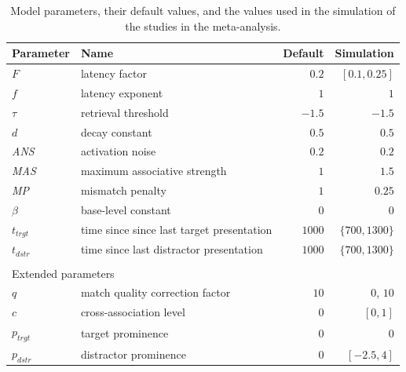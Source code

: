\documentclass{cambridge7A}\usepackage[]{graphicx}\usepackage[]{color}
\begin{document}
\begin{subappendices}
\begin{table}[!htbp]
	\caption{Model parameters, their default values, and the values used in the simulation of the studies in the meta-analysis.}
	\begin{center}
	\begin{tabular}{llrr}
	\hline
	Parameter    & Name                                      & Default & Simulation \\
	\hline
	$F$          & latency factor                            & $0.2$ & $[0.1, 0.25]$\\
	$f$          & latency exponent                          & $1$ & $1$ \\
	$\tau$       & retrieval threshold                       & $-1.5$ & $-1.5$ \\ %
	$d$          & decay constant                            & $0.5$ & $0.5$ \\
	\textit{ANS} & activation noise                          & $0.2$ & $0.2$ \\
	\textit{MAS} & maximum associative strength              & $1$ & $1.5$ \\ %
	\textit{MP}  & mismatch penalty                          & $1$ & $0.25$ \\ %
	$\beta$      & base-level constant                       & $0$ & $0$ \\
	$t_{trgt}$   & time since since last target presentation & $1000$ & $\{700, 1300\}$\\
	$t_{dstr}$   & time since last distractor presentation   & $1000$ & $\{700, 1300\}$\\
	{}           &                                           & & \\
 	\multicolumn{3}{l}{Extended parameters} & \\
 	\hline
	$q$          & match quality correction factor           & $10$ & $0$, $10$ \\
	$c$          & cross-association level               		& $0$ & $[0, 1]$ \\
	$p_{trgt}$   & target prominence                         & $0$ & $0$ \\
	$p_{dstr}$   & distractor prominence                     & $0$ & $[-2.5, 4]$\\
 	\hline
	\end{tabular}
	\end{center}
	\label{tbl:params}
\end{table}


\end{subappendices}
\end{document}
